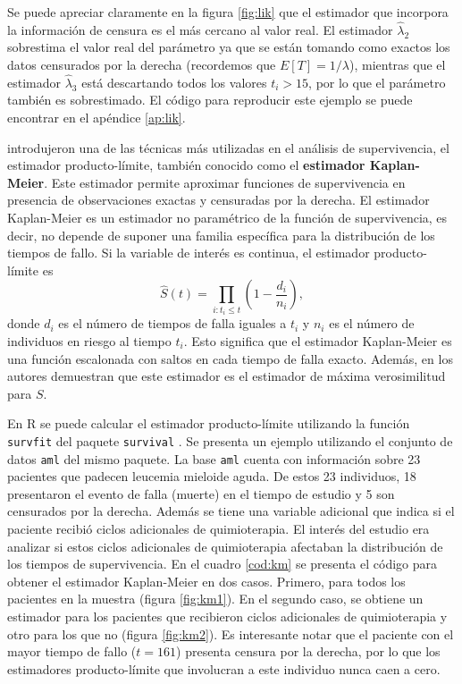 \documentclass[11pt,a4paper]{article}
\begin{document}
Se puede apreciar claramente en la figura \ref{fig:lik} que el estimador que incorpora la información de censura es el más cercano al valor real. El estimador $\hat{\lambda}_2$ sobrestima el valor real del parámetro ya que se están tomando como exactos los datos censurados por la derecha (recordemos que $E[T] = 1/\lambda$), mientras que el estimador $\hat{\lambda}_3$ está descartando todos los valores $t_i > 15$, por lo que el parámetro también es sobrestimado. El código para reproducir este ejemplo se puede encontrar en el apéndice \ref{ap:lik}.

\citet{kaplan-meier} introdujeron una de las técnicas más utilizadas en el análisis de supervivencia, el estimador producto-límite, también conocido como el \textbf{estimador Kaplan-Meier}. Este estimador permite aproximar funciones de supervivencia en presencia de observaciones exactas y censuradas por la derecha. El estimador Kaplan-Meier es un estimador no paramétrico de la función de supervivencia, es decir, no depende de suponer una familia específica para la distribución de los tiempos de fallo. Si la variable de interés es continua, el estimador producto-límite es
\begin{equation}
\label{eq:km}
\hat{S}(t) = \prod_{i: t_i \leq t} \left( 1-\frac{d_i}{n_i}\right),
\end{equation}
donde $d_i$ es el número de tiempos de falla iguales a $t_i$ y $n_i$ es el número de individuos en riesgo al tiempo $t_i$. Esto significa que el estimador Kaplan-Meier es una función escalonada con saltos en cada tiempo de falla exacto. Además, en \cite{kaplan-meier} los autores demuestran que este estimador es el estimador de máxima verosimilitud para $S$.

 En R se puede calcular el estimador producto-límite utilizando la función \texttt{survfit} del paquete \texttt{survival} \citep{survival-book}. Se presenta un ejemplo utilizando el conjunto de datos \texttt{aml} del mismo paquete. La base \texttt{aml} cuenta con información sobre 23 pacientes que padecen leucemia mieloide aguda. De estos 23 individuos, 18 presentaron el evento de falla (muerte) en el tiempo de estudio y 5 son censurados por la derecha. Además se tiene una variable adicional que indica si el paciente recibió ciclos adicionales de quimioterapia. El interés del estudio era analizar si estos ciclos adicionales de quimioterapia afectaban la distribución de los tiempos de supervivencia. En el cuadro \ref{cod:km} se presenta el código para obtener el estimador Kaplan-Meier en dos casos. Primero, para todos los pacientes en la muestra (figura \ref{fig:km1}). En el segundo caso, se obtiene un estimador para los pacientes que recibieron ciclos adicionales de quimioterapia y otro para los que no (figura \ref{fig:km2}). Es interesante notar que el paciente con el mayor tiempo de fallo ($t = 161$) presenta censura por la derecha, por lo que los estimadores producto-límite que involucran a este individuo nunca caen a cero.
\end{document}
